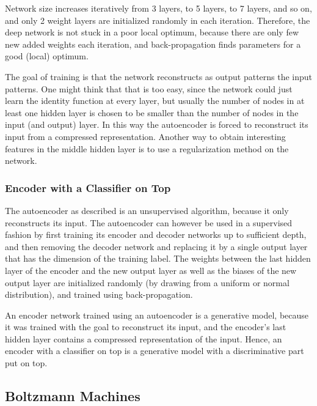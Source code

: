 Network size increases iteratively from 3 layers, to 5 layers, to
7 layers, and so on, and only 2 weight layers are initialized randomly
in each iteration. Therefore, the deep network is not stuck in a poor
local optimum, because there are only few new added weights each iteration,
and back-propagation finds parameters for a good (local) optimum.

The goal of training is that the network reconstructs as output patterns
the input patterns. One might think that that is too easy, since the
network could just learn the identity function at every layer, but
usually the number of nodes in at least one hidden layer is chosen
to be smaller than the number of nodes in the input (and output) layer.
In this way the autoencoder is forced to reconstruct its input from
a compressed representation. Another way to obtain interesting features
in the middle hidden layer is to use a regularization method on the
network.

\subsubsection{Encoder with a Classifier on Top}

The autoencoder as described is an unsupervised algorithm, because
it only reconstructs its input. The autoencoder can however be used
in a supervised fashion by first training its encoder and decoder
networks up to sufficient depth, and then removing the decoder network
and replacing it by a single output layer that has the dimension of
the training label. The weights between the last hidden layer of the
encoder and the new output layer as well as the biases of the new
output layer are initialized randomly (by drawing from a uniform or
normal distribution), and trained using back-propagation.

An encoder network trained using an autoencoder is a generative model,
because it was trained with the goal to reconstruct its input, and
the encoder's last hidden layer contains a compressed representation
of the input. Hence, an encoder with a classifier on top is a generative
model with a discriminative part put on top.

\subsection{Boltzmann Machines}


